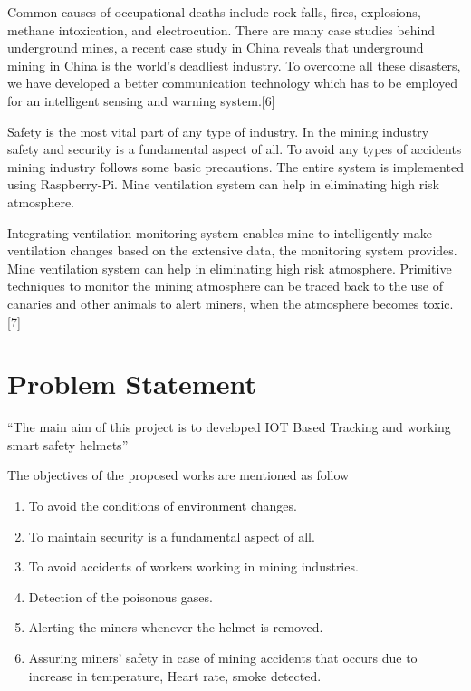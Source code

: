 \documentclass[12pt,a4paper]{report}
\begin{document}
\noindent Common causes of occupational deaths include rock falls, fires, explosions, methane intoxication, and electrocution. There are many case studies behind underground mines, a recent case study in China reveals that underground mining in China is the world's deadliest industry. To overcome all these disasters, we have developed a better communication technology which has to be employed for an intelligent sensing and warning system.[6]

\noindent Safety is the most vital part of any type of industry. In the mining industry safety and security is a fundamental aspect of all. To avoid any types of accidents mining industry follows some basic precautions. The entire system is implemented using Raspberry-Pi. Mine ventilation system can help in eliminating high risk atmosphere. 

\noindent Integrating ventilation monitoring system enables mine to intelligently make ventilation changes based on the extensive data, the monitoring system provides. Mine ventilation system can help in eliminating high risk atmosphere. Primitive techniques to monitor the mining atmosphere can be traced back to the use of canaries and other animals to alert miners, when the atmosphere becomes toxic.[7]

\noindent 


\section{ Problem Statement}

\noindent          ``The main aim of this project is to developed IOT Based Tracking and working smart safety helmets''

\noindent 



\noindent The objectives of the proposed works are mentioned as follow 

\begin{enumerate}
\item  To avoid the conditions of environment changes.

\item  To maintain security is a fundamental aspect of all.

\item  To avoid accidents of workers working in mining industries. 

\item  Detection of the poisonous gases. 

\item  Alerting the miners whenever the helmet is removed.

\item  Assuring miners' safety in case of mining accidents that occurs due to increase in temperature, Heart rate, smoke detected.
\end{enumerate}
\end{document}
